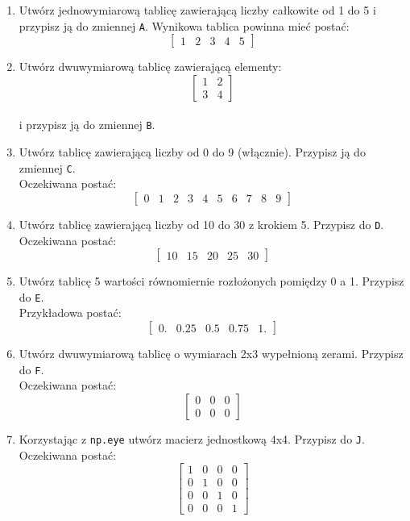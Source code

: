 \documentclass[
  polish,
  letterpaper,
  DIV=11,
  numbers=noendperiod]{scrreprt}
\begin{document}
\begin{enumerate}
\def\labelenumi{\arabic{enumi}.}
\item
  Utwórz jednowymiarową tablicę zawierającą liczby całkowite od 1 do 5 i
  przypisz ją do zmiennej \texttt{A}. Wynikowa tablica powinna mieć
  postać: \[\begin{bmatrix}1 & 2 & 3 & 4 & 5\end{bmatrix} \]
\item
  Utwórz dwuwymiarową tablicę zawierającą elementy:
  \[\begin{bmatrix}1 & 2 \\ 3 & 4\end{bmatrix} \]\\
  i przypisz ją do zmiennej \texttt{B}.
\item
  Utwórz tablicę zawierającą liczby od 0 do 9 (włącznie). Przypisz ją do
  zmiennej \texttt{C}.\\
  Oczekiwana postać:
  \[\begin{bmatrix}0 & 1 & 2 & 3 & 4 & 5 & 6 & 7 & 8 & 9\end{bmatrix} \]
\item
  Utwórz tablicę zawierającą liczby od 10 do 30 z krokiem 5. Przypisz do
  \texttt{D}.\\
  Oczekiwana postać:
  \[\begin{bmatrix}10 & 15 & 20 & 25 & 30\end{bmatrix} \]
\item
  Utwórz tablicę 5 wartości równomiernie rozłożonych pomiędzy 0 a 1.
  Przypisz do \texttt{E}.\\
  Przykładowa postać:
  \[\begin{bmatrix}0. & 0.25 & 0.5 & 0.75 & 1.\end{bmatrix} \]
\item
  Utwórz dwuwymiarową tablicę o wymiarach 2x3 wypełnioną zerami.
  Przypisz do \texttt{F}.\\
  Oczekiwana postać:
  \[\begin{bmatrix}0 & 0 & 0 \\ 0 & 0 & 0\end{bmatrix} \]
\item
  Korzystając z \texttt{np.eye} utwórz macierz jednostkową 4x4. Przypisz
  do \texttt{J}.\\
  Oczekiwana postać:
  \[\begin{bmatrix}1 & 0 & 0 & 0 \\ 0 & 1 & 0 & 0 \\ 0 & 0 & 1 & 0 \\ 0 & 0 & 0 & 1\end{bmatrix} \]
\end{enumerate}
\end{document}
